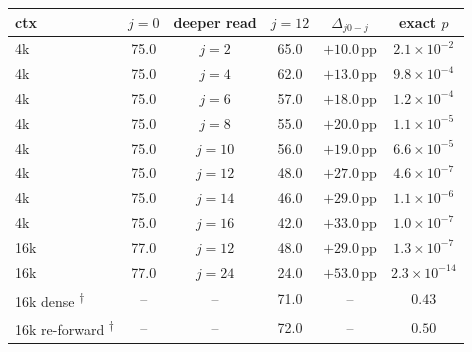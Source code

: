 \begin{table}[t]
\centering
\small
\setlength{\tabcolsep}{4pt}
\begin{tabular}{@{}lccccc@{}}
\toprule
\textbf{ctx} & \textbf{$j{=}0$} & \textbf{deeper read} & $j{=}12$ & \textbf{$\Delta_{j0{-}j}$} & \textbf{exact $p$} \\
\midrule
4k & 75.0 & $j{=}2$ & 65.0 & $+10.0$\,pp & $2.1\times10^{-2}$ \\
4k & 75.0 & $j{=}4$ & 62.0 & $+13.0$\,pp & $9.8\times10^{-4}$ \\
4k & 75.0 & $j{=}6$ & 57.0 & $+18.0$\,pp & $1.2\times10^{-4}$ \\
4k & 75.0 & $j{=}8$ & 55.0 & $+20.0$\,pp & $1.1\times10^{-5}$ \\
4k & 75.0 & $j{=}10$ & 56.0 & $+19.0$\,pp & $6.6\times10^{-5}$ \\
4k & 75.0 & $j{=}12$ & 48.0 & $+27.0$\,pp & $4.6\times10^{-7}$ \\
4k & 75.0 & $j{=}14$ & 46.0 & $+29.0$\,pp & $1.1\times10^{-6}$ \\
4k & 75.0 & $j{=}16$ & 42.0 & $+33.0$\,pp & $1.0\times10^{-7}$ \\
\midrule
16k & 77.0 & $j{=}12$ & 48.0 & $+29.0$\,pp & $1.3\times10^{-7}$ \\
16k & 77.0 & $j{=}24$ & 24.0 & $+53.0$\,pp & $2.3\times10^{-14}$ \\
\midrule
16k dense \textsuperscript{$\dagger$} & -- & -- & 71.0 & -- & $0.43$ \\
16k \mbox{re-forward} \textsuperscript{$\dagger$} & -- & -- & 72.0 & -- & $0.50$ \\
\bottomrule
\end{tabular}


\end{table}
